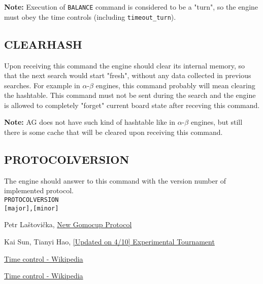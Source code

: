 \documentclass[12pt,a4paper]{article}
\begin{document}
\textbf{Note:} Execution of \texttt{BALANCE} command is considered to be a "turn", so the engine must obey the time controls (including \texttt{timeout{\_}turn}).


\subsection{CLEARHASH}
\label{cmd_clearhash}
Upon receiving this command the engine should clear its internal memory, so that the next search would start "fresh", without any data collected in previous searches. For example in $\alpha$-$\beta$ engines, this command probably will mean clearing the hashtable. This command must not be sent during the search and the engine is allowed to completely "forget" current board state after receving this command.

\textbf{Note:} AG does not have such kind of hashtable like in $\alpha$-$\beta$ engines, but still there is some cache that will be cleared upon receiving this command.


\subsection{PROTOCOLVERSION}
\label{cmd_protocol_version}
The engine should answer to this command with the version number of implemented protocol.\\
\texttt{PROTOCOLVERSION} \\
\texttt{[major],[minor]} \\


\begin{thebibliography}{99}
Petr Laštovička, \href{http://petr.lastovicka.sweb.cz/protocl2en.htm}{New Gomocup Protocol}

Kai Sun, Tianyi Hao, \href{https://gomocup.org/news/experimental-tournament-update-2020/}{[Updated on 4/10] Experimental Tournament}

\href{https://en.wikipedia.org/wiki/Time_control#Increment_and_delay_methods}{Time control - Wikipedia}

\href{https://en.wikipedia.org/wiki/Time_control#Sudden_death}{Time control - Wikipedia}

\end{thebibliography}
\end{document}
